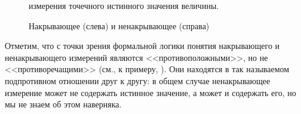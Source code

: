 \documentclass[a5paper,openany]{book}
\newcommand{\mbb}{\mathbb}
\begin{document}
\begin{figure}[!htb]
\unitlength=1mm
\centering\small 
\caption{Накрывающее (слева) и ненакрывающее (справа)} 
измерения точечного истинного значения величины.
\label{PCoverMeasurPic} 
\end{figure} 
  
  
Отметим, что с точки зрения формальной логики понятия накрывающего и ненакрывающего 
измерений являются <<противоположными>>, но не <<противоречащими>> (см., к примеру, 
\cite{Chelpanov}). Они находятся в так называемом подпротивном отношении друг к другу: 
в общем случае ненакрывающее измерение может не содержать истинное значение, а может 
и содержать его, но мы не знаем об этом наверняка. 
    
  
\end{document}

